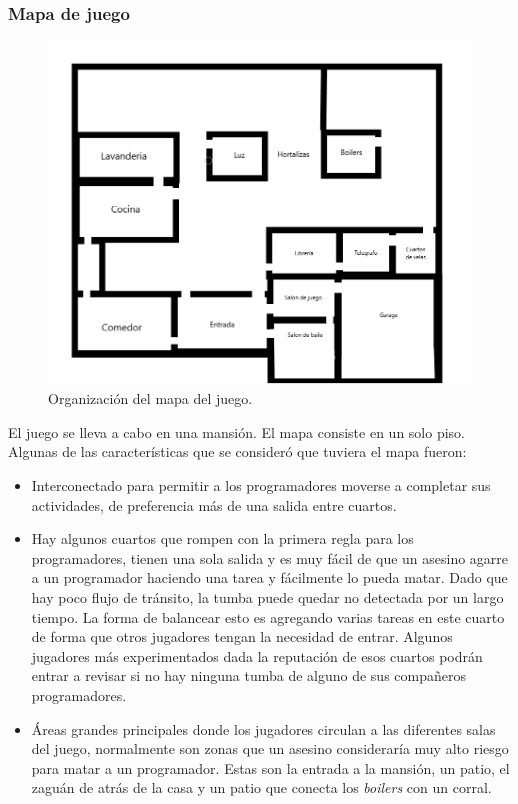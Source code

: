 \subsubsection{Mapa de juego}
\begin{figure}[h]
    \centering
    \includegraphics[width=1\linewidth]{images/MapaJuego.png}
    \caption{Organización del mapa del juego.}
    \label{fig:mapa_juego}
\end{figure}
El juego se lleva a cabo en una mansión. El mapa consiste en un solo piso. Algunas de las características que se consideró que tuviera el mapa fueron:
\begin{itemize}
    \item Interconectado para permitir a los programadores moverse a completar sus actividades, de preferencia más de una salida entre cuartos. 
    \item Hay algunos cuartos que rompen con la primera regla para los programadores, tienen una sola salida y es muy fácil de que un asesino agarre a un programador haciendo una tarea y fácilmente lo pueda matar. Dado que hay poco flujo de tránsito, la tumba puede quedar no detectada por un largo tiempo. La forma de balancear esto es agregando varias tareas en este cuarto de forma que otros jugadores tengan la necesidad de entrar. Algunos jugadores más experimentados dada la reputación de esos cuartos podrán entrar a revisar si no hay ninguna tumba de alguno de sus compañeros programadores.
    \item Áreas grandes principales donde los jugadores circulan a las diferentes salas del juego, normalmente son zonas que un asesino consideraría muy alto riesgo para matar a un programador. Estas son la entrada a la mansión, un patio, el zaguán de atrás de la casa y un patio que conecta los \textit{boilers} con un corral.
\end{itemize}

